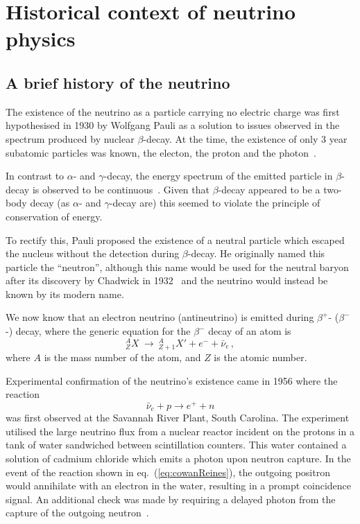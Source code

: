 \chapter{Historical context of neutrino physics}
\label{ch:history}

\section{A brief history of the neutrino}
\label{sec:history:history}

The existence of the neutrino as a particle carrying no electric charge was first hypothesised in 1930 by Wolfgang Pauli as a solution to issues observed in the spectrum produced by nuclear $\beta$-decay.
At the time, the existence of only 3 year subatomic particles was known, the electon, the proton and the photon~\cite{ideaOfNeutrino}.

In contrast to $\alpha$- and $\gamma$-decay, the energy spectrum of the emitted particle in $\beta$-decay is observed to be continuous~\cite{ideaOfNeutrino}.
Given that $\beta$-decay appeared to be a two-body decay (as $\alpha$- and $\gamma$-decay are) this seemed to violate the principle of conservation of energy.

To rectify this, Pauli proposed the existence of a neutral particle which escaped the nucleus without the detection during $\beta$-decay.
He originally named this particle the ``neutron'', although this name would be used for the neutral baryon after its discovery by Chadwick in 1932~\cite{neutronDiscovery} and the neutrino would instead be known by its modern name.

We now know that an electron neutrino (antineutrino) is emitted during $\beta^{+}$- ($\beta^{-}$-) decay, where the generic equation for the $\beta^{-}$ decay of an atom is
\begin{equation}
  ^{A}_{Z}X~\rightarrow~^{A}_{Z+1}X' + e^{-} + \bar{\nu}_{e} \,,
\end{equation}
where $A$ is the mass number of the atom, and $Z$ is the atomic number. 

Experimental confirmation of the neutrino's existence came in 1956 where the reaction
\begin{equation}
  \bar{\nu}_{e} + p \rightarrow e^{+} + n
  \label{eq:cowanReines}
\end{equation}
was first observed at the Savannah River Plant, South Carolina. The experiment utilised the large neutrino flux from a nuclear reactor incident on the protons in a tank of water sandwiched between scintillation counters.
This water contained a solution of cadmium chloride which emits a photon upon neutron capture.
In the event of the reaction shown in eq.~(\ref{eq:cowanReines}), the outgoing positron would annihilate with an electron in the water, resulting in a prompt coincidence signal.
An additional check was made by requiring a delayed photon from the capture of the outgoing neutron~\cite{cowanReines}.

